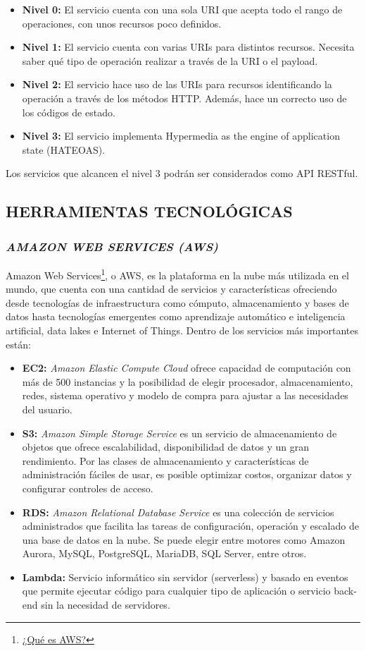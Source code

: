 \begin{itemize}
    \item \textbf{Nivel 0:} El servicio cuenta con una sola URI que acepta todo el rango de operaciones, con unos recursos poco definidos.
    \item \textbf{Nivel 1:} El servicio cuenta con varias URIs para distintos recursos. Necesita saber qué tipo de operación realizar a través de la URI o el payload.
    \item \textbf{Nivel 2:} El servicio hace uso de las URIs para recursos identificando la operación a través de los métodos HTTP. Además, hace un correcto uso de los códigos de estado.
    \item \textbf{Nivel 3:} El servicio implementa Hypermedia as the engine of application state (HATEOAS).
\end{itemize}
Los servicios que alcancen el nivel 3 podrán ser considerados como API RESTful.

\subsection{HERRAMIENTAS TECNOLÓGICAS}

\subsubsection*{\textit{AMAZON WEB SERVICES (AWS)} }

Amazon Web Services\footnote{\href{https://aws.amazon.com/es/what-is-aws/}{¿Qué es AWS?}}, o AWS, es la plataforma en la nube más utilizada en el mundo, que cuenta con una cantidad de servicios y características ofreciendo desde tecnologías de infraestructura como cómputo, almacenamiento y bases de datos hasta tecnologías emergentes como aprendizaje automático e inteligencia artificial, data lakes e Internet of Things. Dentro de los servicios más importantes están:
\begin{itemize}
    \item \textbf{EC2:} \textit{Amazon Elastic Compute Cloud} ofrece capacidad de computación con más de 500 instancias y la posibilidad de elegir procesador, almacenamiento, redes, sistema operativo y modelo de compra para ajustar a las necesidades del usuario.
    \item \textbf{S3:} \textit{Amazon Simple Storage Service} es un servicio de almacenamiento de objetos que ofrece escalabilidad, disponibilidad de datos y un gran rendimiento. Por las clases de almacenamiento y características de administración fáciles de usar, es posible optimizar costos, organizar datos y configurar controles de acceso.
    \item \textbf{RDS:} \textit{Amazon Relational Database Service} es una colección de servicios administrados que facilita las tareas de configuración, operación y escalado de una base de datos en la nube. Se puede elegir entre motores como Amazon Aurora, MySQL, PostgreSQL, MariaDB, SQL Server, entre otros.
    \item \textbf{Lambda:} Servicio informático sin servidor (serverless) y basado en eventos que permite ejecutar código para cualquier tipo de aplicación o servicio back-end sin la necesidad de servidores.
\end{itemize}

